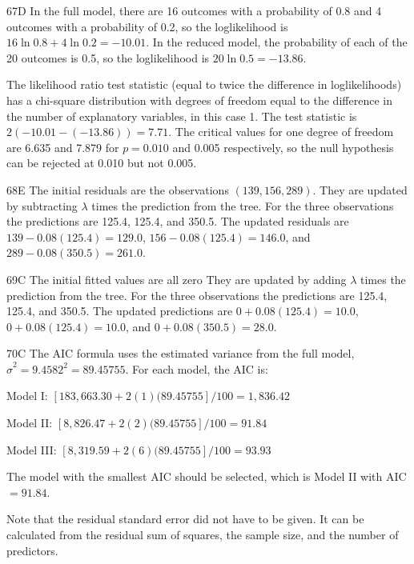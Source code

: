 \begin{solution}{67}{D}
In the full model, there are 16 outcomes with a probability of 0.8 and 4 outcomes with a probability of 0.2, so the loglikelihood is $16 \ln 0.8 + 4 \ln 0.2 = -10.01$. In the reduced model, the probability of each of the 20 outcomes is 0.5, so the loglikelihood is $20 \ln 0.5 = -13.86$.

The likelihood ratio test statistic (equal to twice the difference in loglikelihoods) has a chi-square distribution with degrees of freedom equal to the difference in the number of explanatory variables, in this case 1. The test statistic is $2(-10.01 - (-13.86)) = 7.71$. The critical values for one degree of freedom are 6.635 and 7.879 for $p = 0.010$ and 0.005 respectively, so the null hypothesis can be rejected at 0.010 but not 0.005.
\end{solution}

\begin{solution}{68}{E}
The initial residuals are the observations $(139, 156, 289)$. They are updated by subtracting $\lambda$ times the prediction from the tree. For the three observations the predictions are 125.4, 125.4, and 350.5. The updated residuals are $139 - 0.08(125.4) = 129.0$, $156 - 0.08(125.4) = 146.0$, and $289 - 0.08(350.5) = 261.0$.
\end{solution}

\begin{solution}{69}{C}
The initial fitted values are all zero They are updated by adding $\lambda$ times the prediction from the tree. For the three observations the predictions are 125.4, 125.4, and 350.5. The updated predictions are $0 + 0.08(125.4) = 10.0$, $0 + 0.08(125.4) = 10.0$, and $0 + 0.08(350.5) = 28.0$.
\end{solution}

\begin{solution}{70}{C}
The AIC formula uses the estimated variance from the full model, $\hat{\sigma}^2 = 9.4582^2 = 89.45755$. For each model, the AIC is:

Model I: $[183{,}663.30 + 2(1)(89.45755]/100 = 1{,}836.42$

Model II: $[8{,}826.47 + 2(2)(89.45755]/100 = 91.84$

Model III: $[8{,}319.59 + 2(6)(89.45755]/100 = 93.93$

The model with the smallest AIC should be selected, which is Model II with AIC $= 91.84$.

Note that the residual standard error did not have to be given. It can be calculated from the residual sum of squares, the sample size, and the number of predictors.
\end{solution}

